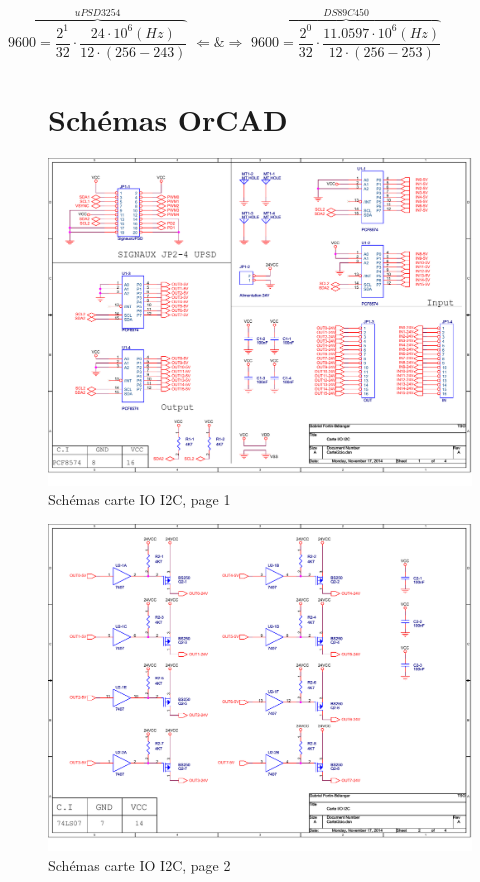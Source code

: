 \documentclass[10pt,a4paper,final]{article}
\begin{document}
\begin{spacing}{1.5}
$\overbrace{9600 = \dfrac{2^{1}}{32} \cdot \dfrac{24\cdot10^{6}(Hz)}{12\cdot(256 - 243)}}^{uPSD 3254} $ $\Leftarrow \& \Rightarrow $ $ \overbrace{9600 = \dfrac{2^{0}}{32}\cdot \dfrac{11.0597 \cdot 10^{6}(Hz)}{12\cdot(256 - 253)}}^{DS89C450}$
\pagebreak


\begin{figure}[hbtp]
\section{Schémas OrCAD}
\caption{Schémas carte IO I2C, page 1}
\centering
\includegraphics[scale=0.87,angle=90]{Figures/OrCad/PAGE1.pdf}
\end{figure}

\begin{figure}[hbtp]
\caption{Schémas carte IO I2C, page 2}
\centering
\includegraphics[scale=0.87,angle=90]{Figures/OrCad/PAGE2.pdf}
\end{figure}


\end{spacing}
\end{document}
